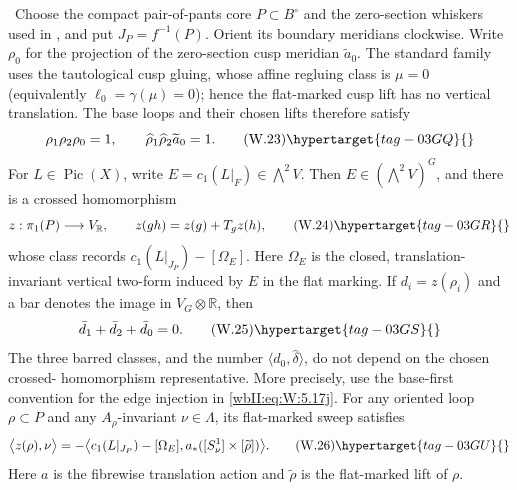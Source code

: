 \begin{lemma}
\hypertarget{tag-03IC}{}\label{wbII:lem:picard-crossed-defect}


\ Choose the compact pair-of-pants core $P\subset B^\circ$ and
the zero-section whiskers used in , and put
$J_P=f^{-1}(P)$.  Orient its boundary meridians clockwise.  Write
$\rho_0$ for the projection of the zero-section cusp meridian
$\widetilde a_0$.  The standard family uses the tautological cusp
gluing, whose affine regluing class is $\mu=0$ (equivalently
$\ell_0=\gamma(\mu)=0$); hence the flat-marked cusp lift has no vertical
translation.  The base loops and their chosen lifts therefore satisfy
\[
 \rho_1\rho_2\rho_0=1,
 \qquad
 \widehat\rho_1\widehat\rho_2\widetilde a_0=1.
\tag{W.23}\hypertarget{tag-03GQ}{}\label{wbII:eq:W:5.17g}
\]
For $L\in\operatorname{Pic}(X)$, write
$E=c_1(L|_F)\in\bigwedge^2V$.  Then $E\in(\bigwedge^2V)^G$, and there is a
crossed homomorphism
\[
 z:\pi_1(P)\longrightarrow V_{\mathbb R},\qquad
 z(gh)=z(g)+T_gz(h),
\tag{W.24}\hypertarget{tag-03GR}{}\label{wbII:eq:W:5.17h}
\]
whose class records
$c_1(L|_{J_P})-[\Omega_E]$.  Here $\Omega_E$ is the closed, translation-
invariant vertical two-form induced by $E$ in the flat marking.  If
$d_i=z(\rho_i)$ and a bar denotes the image in
$V_G\otimes\mathbb R$, then
\[
 \bar d_1+\bar d_2+\bar d_0=0.
\tag{W.25}\hypertarget{tag-03GS}{}\label{wbII:eq:W:5.17i}
\]
The three barred classes, and the number
$\langle d_0,\widehat\delta\rangle$, do not depend on the chosen crossed-
homomorphism representative.  More precisely, use the base-first convention
for the edge injection in \eqref{wbII:eq:W:5.17j}.  For any oriented loop $\rho\subset P$
and any $A_\rho$-invariant $\nu\in\Lambda$, its flat-marked sweep satisfies
\[
 \bigl\langle z(\rho),\nu\bigr\rangle
 =-\bigl\langle c_1(L|_{J_P})-[\Omega_E],
 a_*([S^1_\nu]\times[\widetilde\rho])\bigr\rangle.
\tag{W.26}\hypertarget{tag-03GU}{}\label{wbII:eq:W:5.17j'}
\]
Here $a$ is the fibrewise translation action and $\widetilde\rho$ is the
flat-marked lift of $\rho$.
\end{lemma}

